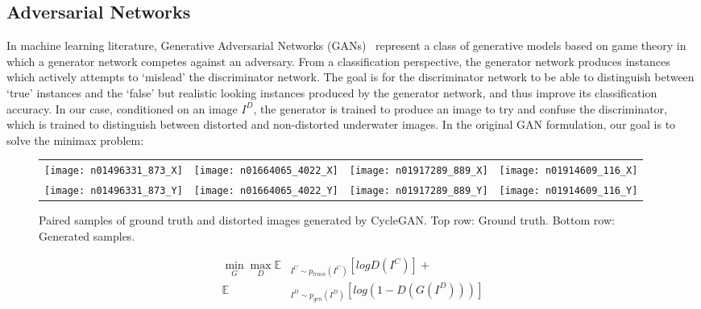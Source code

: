 \subsection{Adversarial Networks}
In machine learning literature, Generative Adversarial Networks 
(GANs)~\cite{goodfellow2014generative} represent a class of generative models based on game theory in which a generator network 
competes against an adversary. From a classification perspective, the generator network produces instances which actively attempts 
to `mislead' the discriminator network. The goal is for the discriminator network to be able to distinguish between `true' 
instances and the `false' but realistic looking instances produced by the generator network, and thus improve its classification 
accuracy. In our case, conditioned on an image $I^D$, the generator is trained to produce an image to try and confuse the 
discriminator, which is trained to distinguish between distorted and non-distorted underwater images. In the original GAN 
formulation, our goal is to solve the minimax problem:

\begin{figure}
\centering
\begin{tabular}{p{1.7cm} p{1.7cm} p{1.7cm} p{1.7cm}}
   
   \texttt{[image: n01496331\_873\_X]} &
   \texttt{[image: n01664065\_4022\_X]} &
   \texttt{[image: n01917289\_889\_X]} &
   \texttt{[image: n01914609\_116\_X]} \\
   \texttt{[image: n01496331\_873\_Y]} &
   \texttt{[image: n01664065\_4022\_Y]} &
   \texttt{[image: n01917289\_889\_Y]} &
   \texttt{[image: n01914609\_116\_Y]} \\

\end{tabular}
\label{fig:cgan_samples}
\caption{Paired samples of ground truth and distorted images generated by CycleGAN. Top row: Ground truth.
Bottom row: Generated samples.}
\end{figure}


\begin{equation}
\begin{aligned}
   \min\limits_{G}\max\limits_{D} \mathbb{E} & _{I^C \sim p_{train}(I^C)} [logD(I^C)] + \\
   \mathbb{E} & _{I^D \sim p_{gen}(I^D)}[log(1 - D(G(I^D)))]
\end{aligned}
\end{equation}

